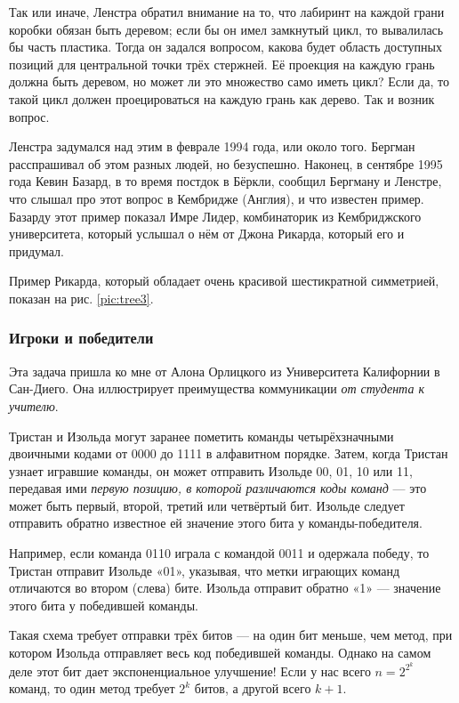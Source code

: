Так или иначе, Ленстра обратил внимание на то, что лабиринт на каждой грани коробки обязан быть деревом;
если бы он имел замкнутый цикл, то вывалилась бы часть пластика.
Тогда он задался вопросом, какова будет область доступных позиций для центральной точки трёх стержней.
Её проекция на каждую грань должна быть деревом, но может ли это множество само иметь цикл?
Если да, то такой цикл должен проецироваться на каждую грань как дерево.
Так и возник вопрос.

Ленстра задумался над этим в феврале 1994 года, или около того.
Бергман расспрашивал об этом разных людей, но безуспешно.
Наконец, в сентябре 1995 года Кевин Базард, в то время постдок в Бёркли, сообщил Бергману и Ленстре, что слышал про этот вопрос в Кембридже (Англия), и что известен пример.
Базарду этот пример показал Имре Лидер, комбинаторик из Кембриджского университета, который услышал о нём от Джона Рикарда, который его и придумал.

Пример Рикарда, который обладает очень красивой шестикратной симметрией, показан на рис. \ref{pic:tree3}.

\subsubsection*{Игроки и победители}

Эта задача пришла ко мне от Алона Орлицкого из Университета Калифорнии в Сан-Диего.
Она иллюстрирует преимущества коммуникации \emph{от студента к учителю}.

Тристан и Изольда могут заранее пометить команды четырёхзначными двоичными кодами от 0000 до 1111 в алфавитном порядке.
Затем, когда Тристан узнает игравшие команды, он может отправить Изольде 00, 01, 10 или 11, передавая ими \emph{первую позицию, в которой различаются коды команд} --- это может быть первый, второй, третий или четвёртый бит.
Изольде следует отправить обратно известное ей значение этого бита у команды-победителя.

Например, если команда 0110 играла с командой 0011 и одержала победу,
то Тристан отправит Изольде «01», указывая, что метки играющих команд отличаются во втором (слева) бите.
Изольда отправит обратно «1» --- значение этого бита у победившей команды.

Такая схема требует отправки трёх битов --- на один бит меньше, чем метод, при котором Изольда отправляет весь код победившей команды.
Однако на самом деле этот бит дает экспоненциальное улучшение!
Если у нас всего $n = 2^{2^k}$ команд, то один метод требует $2^k$ битов, а другой всего $k + 1$.


